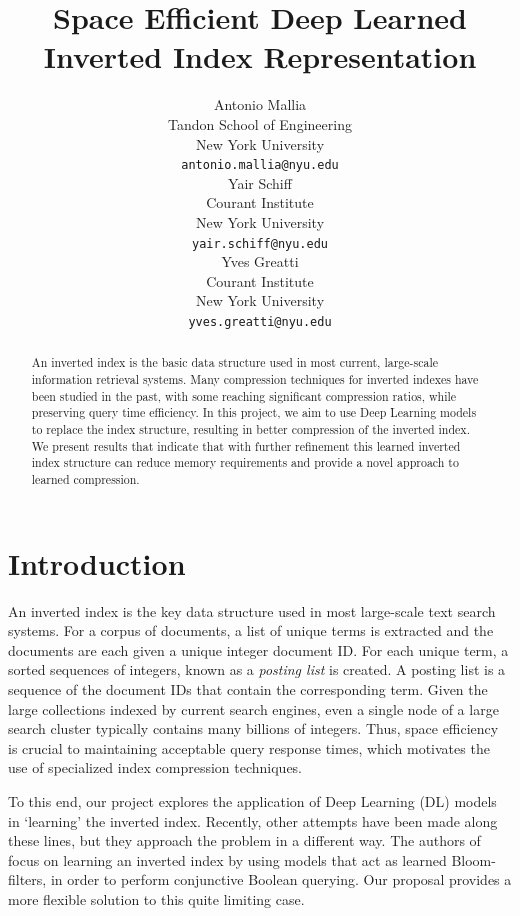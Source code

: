 \documentclass{article}
\title{Space Efficient Deep Learned Inverted Index Representation}
\author{%
  Antonio Mallia \\
  Tandon School of Engineering\\
  New York University\\
  \texttt{antonio.mallia@nyu.edu} \\
   \And
    Yair Schiff \\
    Courant Institute\\
    New York University\\
    \texttt{yair.schiff@nyu.edu} \\
    \And 
    Yves Greatti \\
    Courant Institute\\
    New York University\\
    \texttt{yves.greatti@nyu.edu}
}
\begin{document}
\maketitle

\begin{abstract}
An inverted index is the basic data structure used in most current, large-scale information retrieval systems.
Many compression techniques for inverted indexes have been studied in the past, with some reaching significant compression ratios, while preserving query time efficiency.
In this project, we aim to use Deep Learning models to replace the index structure, resulting in better compression of the inverted index. We present results that indicate that with further refinement this learned inverted index structure can reduce memory requirements and provide a novel approach to learned compression.
\end{abstract}

\section{Introduction}\label{sec:intro}
An inverted index is the key data structure used in most large-scale text search systems.
For a corpus of documents, a list of unique terms is extracted and the documents are each given a unique integer document ID.
For each unique term, a sorted sequences of integers, known as a \textit{posting list} is created.
A posting list is a sequence of the document IDs that contain the corresponding term.
Given the large collections indexed by current search engines, even a single node of a large search cluster typically contains many billions of integers.
Thus, space efficiency is crucial to maintaining acceptable query response times, which motivates the use of specialized index compression techniques.

To this end, our project explores the application of Deep Learning (DL) models in `learning' the inverted index.
Recently, other attempts have been made \cite{OosterhuisCR18} along these lines, but they approach the problem in a different way. The authors of \citet{OosterhuisCR18} focus on learning an inverted index by using models that act as learned Bloom-filters, in order to perform conjunctive Boolean querying.
Our proposal provides a more flexible solution to this quite limiting case.
\end{document}
